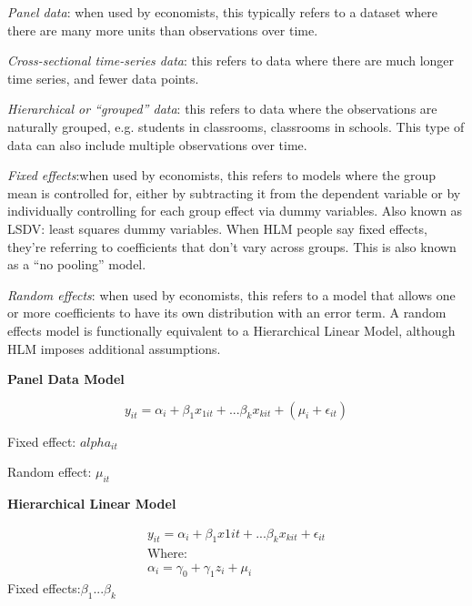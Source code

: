 \documentclass[12pt]{article}
\begin{document}
\begin{description}
\item \emph{Panel data}: when used by economists, this typically
  refers to a dataset where there are many more units than
  observations over time. 

\item \emph{Cross-sectional time-series data}: this refers to data
  where there are much longer time series, and fewer data points. 

\item \emph{Hierarchical or ``grouped'' data}: this refers to data
  where the observations are naturally grouped, e.g. students in
  classrooms, classrooms in schools. This type of data can also
  include multiple observations over time. 

\item \emph{Fixed effects}:when used by economists, this refers to
  models where the group mean is controlled for, either by subtracting
  it from the dependent variable or by individually controlling for
  each group effect via dummy variables. Also known as LSDV: least
  squares dummy variables. When HLM people say fixed effects, they're
  referring to coefficients that don't vary across groups. This is
  also known as a ``no pooling'' model. 


\item \emph{Random effects}: when used by economists, this refers to a
  model that allows one or more coefficients to have its own
  distribution with an error term. A random effects model is
  functionally equivalent to a Hierarchical Linear Model, although HLM
  imposes additional assumptions. 


\end{description}


\textbf{Panel Data Model}

\begin{equation}
  y_{it}=\alpha_i+\beta_1x_{1it}+...\beta_kx_{kit}+(\mu_i+\epsilon_{it})
\end{equation}

Fixed effect: $alpha_{it}$

Random effect: $\mu_{it}$

\vskip 24pt

\textbf{Hierarchical Linear Model}

\begin{multline}
  y_{it}=\alpha_i+ \beta_1x{1it}+...\beta_kx_{kit}+\epsilon_{it}\\
  \text{Where:} \\
  \alpha_i=\gamma_0+\gamma_1z_i+\mu_i
\end{multline}
Fixed effects:$\beta_1...\beta_k$
\end{document}
